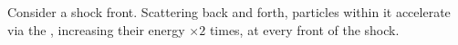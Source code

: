 %
%
%
%
%
%
%
%






Consider a shock front. Scattering back and forth, particles within it accelerate 
via the , increasing their energy $\times 2$ times, at every front of the shock.



